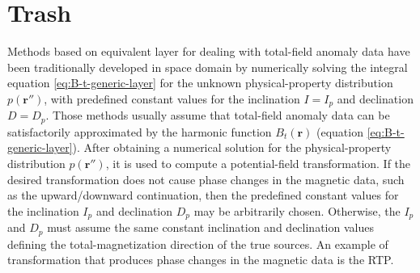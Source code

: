 \section{Trash}
\label{sec:trash}

Methods based on equivalent layer for dealing with total-field anomaly data 
have been traditionally developed in space domain 
\cite[e.g.,][]{silva_1986, oliveirajr-etal_2013}
by numerically solving the integral equation \ref{eq:B-t-generic-layer} 
for the unknown physical-property distribution $p(\mathbf{r}'')$, 
with predefined constant values for the inclination $I = I_{p}$ and declination $D = D_{p}$. 
Those methods usually assume that total-field anomaly data 
can be satisfactorily approximated by the harmonic function $B_{t}(\mathbf{r})$
(equation \ref{eq:B-t-generic-layer}).
After obtaining a numerical solution for the physical-property distribution 
$p(\mathbf{r}'')$, it is used to compute a potential-field transformation. 
If the desired transformation does not
cause phase changes in the magnetic data, such as the upward/downward continuation, 
then the predefined constant values for the inclination $I_{p}$ and declination $D_{p}$ 
may be arbitrarily chosen. 
Otherwise, the $I_{p}$ and $D_{p}$ must assume the same constant inclination and declination
values defining the total-magnetization direction of the true sources. An example of 
transformation that produces phase changes in the magnetic data is the RTP.
